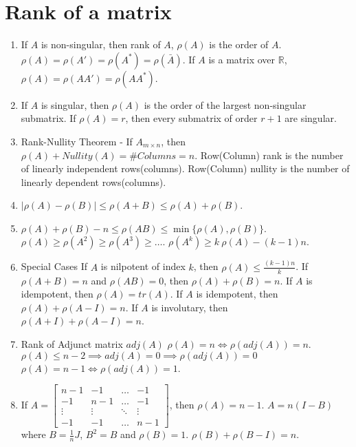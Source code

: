 \section{Rank of a matrix}
\begin{enumerate}
	\item If $A$ is non-singular, then rank of $A$, $\rho(A)$ is the order of $A$.
		\subitem $\rho(A) = \rho(A') = \rho(A^\ast) = \rho(\bar{A})$.
		\subitem If $A$ is a matrix over $\mathbb{R}$, $\rho(A) = \rho(AA') = \rho(AA^\ast)$.
	\item If $A$ is singular, then $\rho(A)$ is the order of the largest non-singular submatrix.
		\subitem If $\rho(A) = r$, then every submatrix of order $r+1$ are singular.
	\item Rank-Nullity Theorem - If $A_{m \times n}$, then $\rho(A) + Nullity(A) = \# Columns = n$.
		\subitem Row(Column) rank is the number of linearly independent rows(columns).
		\subitem Row(Column) nullity is the number of linearly dependent rows(columns).
	\item $|\rho(A)-\rho(B)| \le \rho(A+B) \le \rho(A)+\rho(B)$.
	\item $\rho(A)+\rho(B)-n \le \rho(AB) \le \min\{ \rho(A),\rho(B) \}$.
		\subitem $\rho(A) \ge \rho(A^2) \ge \rho(A^3) \ge \dots$.
		\subitem $\rho(A^k) \ge k\ \rho(A) - (k-1)n$.
	\item Special Cases
		\subitem If $A$ is nilpotent of index $k$, then $\rho(A) \le \frac{(k-1)n}{k}$.
		\subitem If $\rho(A+B) = n$ and $\rho(AB) = 0$, then $\rho(A) + \rho(B) = n$.
		\subitem If $A$ is idempotent, then $\rho(A) = tr(A)$.
		\subitem If $A$ is idempotent, then $\rho(A) + \rho(A-I) = n$.
		\subitem If $A$ is involutary, then $\rho(A+I)+\rho(A-I) = n$.
	\item Rank of Adjunct matrix $adj(A)$
		\subitem $\rho(A) = n \iff \rho(adj(A)) = n$.
		\subitem $\rho(A) \le n-2 \implies adj(A) = 0 \implies \rho(adj(A)) = 0$
		\subitem $\rho(A) = n-1 \iff \rho(adj(A)) = 1$.
	\item If $A = \begin{bmatrix} n-1 & -1 & \dots & -1 \\ -1 & n-1 & \dots & -1 \\ \vdots & \vdots & \ddots & \vdots \\ -1 & - 1 & \dots & n-1 \end{bmatrix}$, then $\rho(A) = n-1$.
		\subitem $A = n(I - B)$ where $B = \frac{1}{n}J$, $B^2 = B$ and $\rho(B) = 1$. $\rho(B) + \rho(B-I) = n$.
\end{enumerate}

